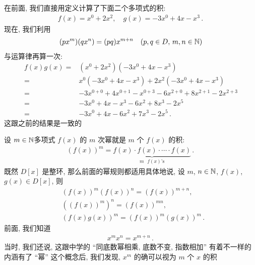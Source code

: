 \begin{example}
    在前面, 我们直接用定义计算了下面二个多项式的积:
    \begin{align*}
        f(x) = x^0 + 2x^2, \quad g(x) = -3x^0 + 4x - x^3 \period
    \end{align*}
    现在, 我们利用
    \begin{align*}
        (px^m) (qx^n) = (pq) x^{m+n} \quad (p,q \in D, \, m,n \in \mathbb{N})
    \end{align*}
    与运算律再算一次:
    \begin{align*}
        f(x) g(x)
        = {} & (x^0 + 2x^2) (-3x^0 + 4x - x^3)                                 \\
        = {} & x^0 (-3x^0 + 4x - x^3) + 2x^2 (-3x^0 + 4x - x^3)                \\
        = {} & -3x^{0+0} + 4x^{0+1} - x^{0+3} - 6x^{2+0} + 8x^{2+1} - 2x^{2+3} \\
        = {} & -3x^0 + 4x - x^3 - 6x^2 + 8x^3 - 2x^5                           \\
        = {} & -3x^0 + 4x - 6x^2 + 7x^3 - 2x^5 \period
    \end{align*}
    这跟之前的结果是一致的\period
\end{example}

\begin{definition}
    设 $m \in \mathbb{N}$\period 多项式 $f(x)$ 的 $m$ 次幂就是 $m$ 个 $f(x)$ 的积:
    \begin{align*}
        (f(x))^m = \underbrace{f(x) \cdot f(x) \cdot \cdots \cdot f(x)}_{\text{$m$ $f(x)$'s}} \period
    \end{align*}
    既然 $D[x]$ 是整环, 那么前面的幂规则都适用\period 具体地说, 设 $m$, $n \in \mathbb{N}$, $f(x)$, $g(x) \in D[x]$, 则
    \begin{align*}
         & (f(x))^m (f(x))^n = (f(x))^{m+n},         \\
         & ((f(x))^m)^n = (f(x))^{mn},               \\
         & (f(x) g(x))^m = (f(x))^m (g(x))^m \period
    \end{align*}
    前面, 我们知道
    \begin{align*}
        x^m x^n = x^{m+n} \period
    \end{align*}
    当时, 我们还说, 这跟中学的 ``同底数幂相乘, 底数不变, 指数相加'' 有着不一样的内涵\period 有了 ``幂'' 这个概念后, 我们发现, $x^m$ 的确可以视为 $m$ 个 $x$ 的积\period
\end{definition}

